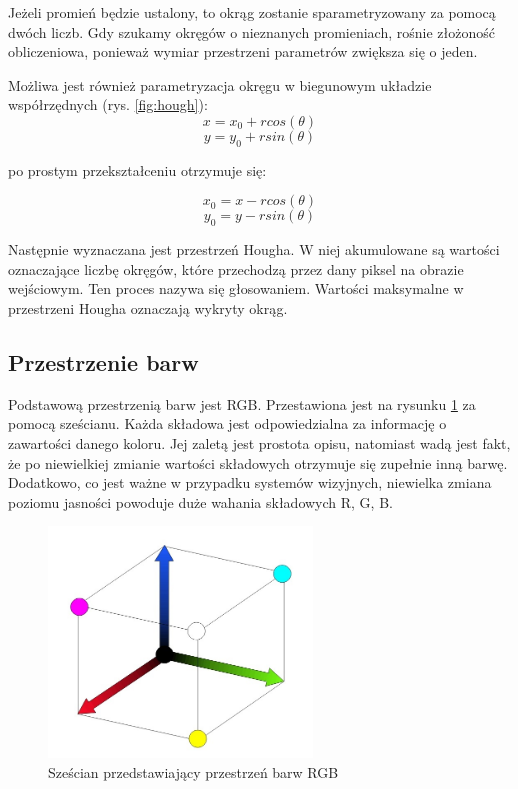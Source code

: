 Jeżeli promień będzie ustalony, to okrąg zostanie sparametryzowany za pomocą dwóch liczb. 
Gdy szukamy okręgów o nieznanych promieniach, rośnie złożoność obliczeniowa, ponieważ wymiar przestrzeni parametrów zwiększa się o jeden.

Możliwa jest również parametryzacja okręgu w biegunowym układzie współrzędnych (rys. \ref{fig:hough}):
\begin{equation}
x = x_0 + rcos(\theta)
\end{equation}
\begin{equation}
y = y_0 + rsin(\theta)
\end{equation}

po prostym przekształceniu otrzymuje się:

\begin{equation}
x_0 = x - rcos(\theta)
\end{equation}
\begin{equation}
y_0 = y - rsin(\theta)
\end{equation}

Następnie wyznaczana jest przestrzeń Hougha. W niej akumulowane są wartości oznaczające liczbę okręgów, które przechodzą przez dany piksel na obrazie wejściowym. Ten proces nazywa się głosowaniem. 
Wartości maksymalne w przestrzeni Hougha oznaczają wykryty okrąg.


\subsection{Przestrzenie barw}

Podstawową przestrzenią barw jest RGB. 
Przestawiona jest na rysunku \ref{fig:rgb} za pomocą sześcianu. 
Każda składowa jest odpowiedzialna za informację o zawartości danego koloru. 
Jej zaletą jest prostota opisu, natomiast wadą jest fakt, że po niewielkiej zmianie wartości składowych otrzymuje się zupełnie inną barwę. 
Dodatkowo, co jest ważne w przypadku systemów wizyjnych, niewielka zmiana poziomu jasności powoduje duże wahania składowych R, G, B.

\begin{figure}
  \centering
  \includegraphics[width=7cm]{img/rgb.jpg}
  \caption{Sześcian przedstawiający przestrzeń barw RGB\cite{W4}}
  \label{fig:rgb}
\end{figure}


